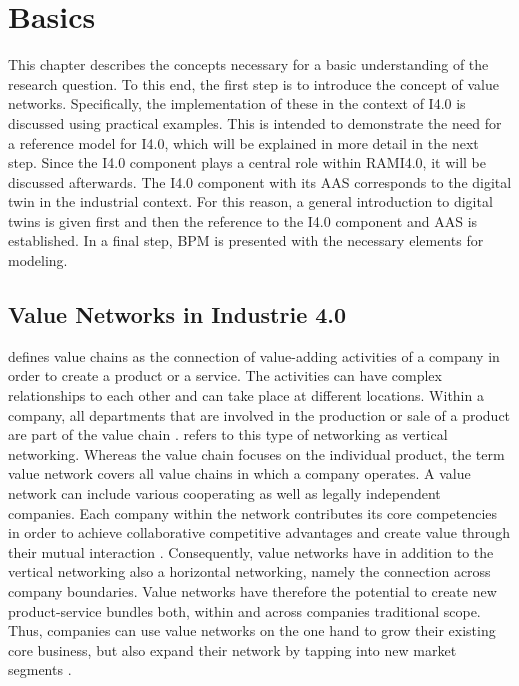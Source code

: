 \chapter{Basics} \label{chap:basics}
This chapter describes the concepts necessary for a basic understanding of the research question. To this end, the first step is to introduce the concept of value networks. Specifically, the implementation of these in the context of \ac{I4.0} is discussed using practical examples. This is intended to demonstrate the need for a reference model for \ac{I4.0}, which will be explained in more detail in the next step. Since the \ac{I4.0} component plays a central role within \ac{RAMI4.0}, it will be discussed afterwards. The \ac{I4.0} component with its \ac{AAS} corresponds to the digital twin in the industrial context. For this reason, a general introduction to digital twins is given first and then the reference to the \ac{I4.0} component and \ac{AAS} is established. In a final step, \ac{BPM} is presented with the necessary elements for modeling.

\section{Value Networks in Industrie 4.0} \label{sec:valuenetworks}
\citet[p. 6]{Sturgeon2001HowNetworks} defines value chains as the connection of value-adding activities of a company in order to create a product or a service. The activities can have complex relationships to each other and can take place at different locations. Within a company, all departments that are involved in the production or sale of a product are part of the value chain \cite[p. 10]{Sturgeon2001HowNetworks}. \citeauthor{Sturgeon2001HowNetworks} refers to this type of networking as vertical networking. Whereas the value chain focuses on the individual product, the term value network covers all value chains in which a company operates. A value network can include various cooperating as well as legally independent companies. Each company within the network contributes its core competencies in order to achieve collaborative competitive advantages and create value through their mutual interaction \cite[p. 3]{Bach2010GeschaftsmodelleGrundlagen}. Consequently, value networks have in addition to the vertical networking also a horizontal networking, namely the connection across company boundaries. Value networks have therefore the potential to create new product-service bundles both, within and across companies traditional scope. Thus, companies can use value networks on the one hand to grow their existing core business, but also expand their network by tapping into new market segments \cite[p. 22]{Acatech2013Recommendations4.0}.

